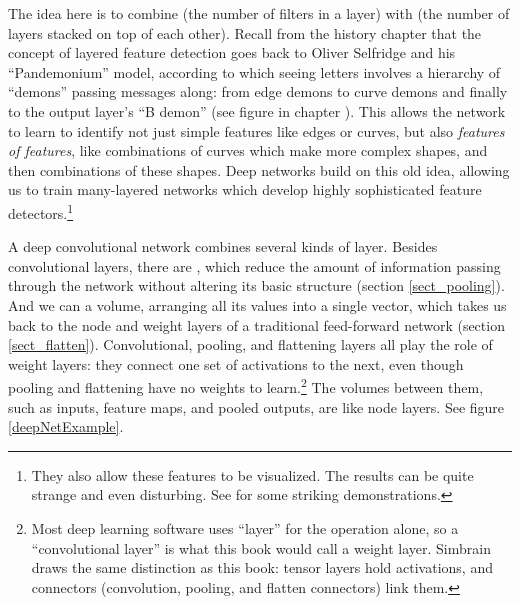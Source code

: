 The idea here is to combine  (the number of filters in a layer) with  (the number of layers stacked on top of each other).
Recall from the history chapter that the concept of layered feature detection goes back to Oliver Selfridge and his ``Pandemonium'' model, according to which seeing letters involves a hierarchy of ``demons'' passing messages along: from edge demons to curve demons and finally to the output layer's ``B demon'' (see figure  in chapter ). This allows the network to learn to identify not just simple features like edges or curves, but also \emph{features of features}, like combinations of curves which make more complex shapes, and then combinations of these shapes. Deep networks build on this old idea, allowing us to train many-layered networks which develop highly sophisticated feature detectors.\footnote{They also allow these features to be visualized. The results can be quite strange and even disturbing. See  for some striking demonstrations.}

A deep convolutional network combines several kinds of layer. Besides convolutional layers, there are , which reduce the amount of information passing through the network without altering its basic structure (section \ref{sect_pooling}). And we can  a volume, arranging all its values into a single vector, which takes us back to the node and weight layers of a traditional feed-forward network (section \ref{sect_flatten}). Convolutional, pooling, and flattening layers all play the role of weight layers: they connect one set of activations to the next, even though pooling and flattening have no weights to learn.\footnote{Most deep learning software uses ``layer'' for the operation alone, so a ``convolutional layer'' is what this book would call a weight layer. Simbrain draws the same distinction as this book: tensor layers hold activations, and connectors (convolution, pooling, and flatten connectors) link them.} The volumes between them, such as inputs, feature maps, and pooled outputs, are like node layers. See figure \ref{deepNetExample}.



